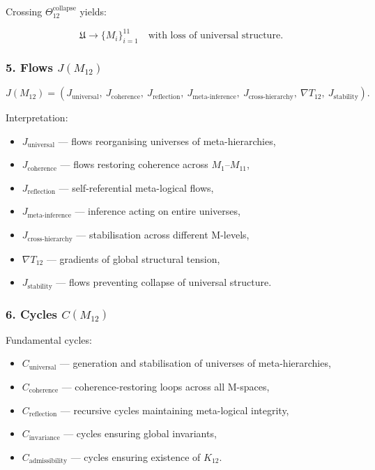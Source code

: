 Crossing $\Theta_{12}^{\mathrm{collapse}}$ yields:

\[
\mathfrak{U} \to \{ M_i \}_{i=1}^{11}
\quad\text{with loss of universal structure}.
\]

\subsubsection*{5. Flows $J(M_{12})$}

\[
J(M_{12})=
(
J_{\mathrm{universal}},\
J_{\mathrm{coherence}},\
J_{\mathrm{reflection}},\
J_{\mathrm{meta\mbox{-}inference}},\
J_{\mathrm{cross\mbox{-}hierarchy}},\
\nabla T_{12},\
J_{\mathrm{stability}}
).
\]

Interpretation:

\begin{itemize}
    \item $J_{\mathrm{universal}}$ — flows reorganising universes of meta-hierarchies,
    \item $J_{\mathrm{coherence}}$ — flows restoring coherence across $M_1$–$M_{11}$,
    \item $J_{\mathrm{reflection}}$ — self-referential meta-logical flows,
    \item $J_{\mathrm{meta\mbox{-}inference}}$ — inference acting on entire universes,
    \item $J_{\mathrm{cross\mbox{-}hierarchy}}$ — stabilisation across different M-levels,
    \item $\nabla T_{12}$ — gradients of global structural tension,
    \item $J_{\mathrm{stability}}$ — flows preventing collapse of universal structure.
\end{itemize}

\subsubsection*{6. Cycles $C(M_{12})$}

Fundamental cycles:

\begin{itemize}
    \item $C_{\mathrm{universal}}$ — generation and stabilisation of universes of meta-hierarchies,
    \item $C_{\mathrm{coherence}}$ — coherence-restoring loops across all M-spaces,
    \item $C_{\mathrm{reflection}}$ — recursive cycles maintaining meta-logical integrity,
    \item $C_{\mathrm{invariance}}$ — cycles ensuring global invariants,
    \item $C_{\mathrm{admissibility}}$ — cycles ensuring existence of $K_{12}$.
\end{itemize}

